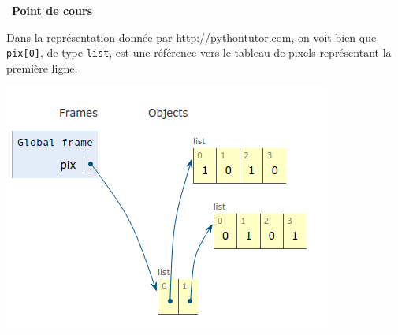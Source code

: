 \documentclass[a4paper, french, 12pt]{article}
\newcounter{cours}
\newenvironment{cours}[1]
{\par \medskip   \addtocounter{cours}{1} \noindent  
\begin{bclogo}[arrondi =0.1,  ombre = true, barre=none, logo=\bcbook, marge=4]{~\textbf{Point de cours} \textbf{\thecours} {\itshape #1} }  \par}
{
\end{bclogo}
 \par \bigskip }
\begin{document}
\begin{cours}{}
Dans la représentation donnée par \href{http://pythontutor.com}{http://pythontutor.com}, on voit bien que \texttt{pix[0]}, de type \texttt{list}, est une référence vers le tableau de pixels représentant la première ligne. 
\begin{center}
\includegraphics[scale=0.8]{images/exemple_binaire_tutor.png}
\end{center}


\end{cours}

\vspace*{-20pt}
\end{document}
